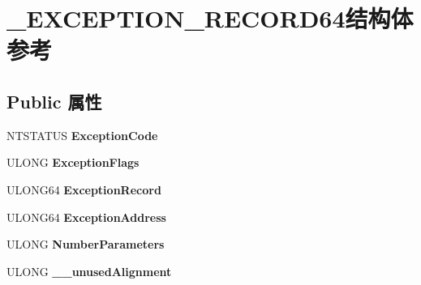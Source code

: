 \hypertarget{struct___e_x_c_e_p_t_i_o_n___r_e_c_o_r_d64}{}\section{\+\_\+\+E\+X\+C\+E\+P\+T\+I\+O\+N\+\_\+\+R\+E\+C\+O\+R\+D64结构体 参考}
\label{struct___e_x_c_e_p_t_i_o_n___r_e_c_o_r_d64}
\subsection*{Public 属性}
\begin{DoxyCompactItemize}
\item 
\mbox{\label{struct___e_x_c_e_p_t_i_o_n___r_e_c_o_r_d64_a2ff9479902da1b59f09d85f098fdedaf}} 
N\+T\+S\+T\+A\+T\+US {\bfseries Exception\+Code}
\item 
\mbox{\label{struct___e_x_c_e_p_t_i_o_n___r_e_c_o_r_d64_a240f00c06caf33235b0e48516a786c49}} 
U\+L\+O\+NG {\bfseries Exception\+Flags}
\item 
\mbox{\label{struct___e_x_c_e_p_t_i_o_n___r_e_c_o_r_d64_aec6ebe4e749c77ec8ce890b4c0e4ae62}} 
U\+L\+O\+N\+G64 {\bfseries Exception\+Record}
\item 
\mbox{\label{struct___e_x_c_e_p_t_i_o_n___r_e_c_o_r_d64_af3ad9ace4f9fd8a05f9067f952296b9f}} 
U\+L\+O\+N\+G64 {\bfseries Exception\+Address}
\item 
\mbox{\label{struct___e_x_c_e_p_t_i_o_n___r_e_c_o_r_d64_a933857db37824ccec22f0f572b9fbbd4}} 
U\+L\+O\+NG {\bfseries Number\+Parameters}
\item 
\mbox{\label{struct___e_x_c_e_p_t_i_o_n___r_e_c_o_r_d64_af98a4858bdd550dceaac222e20145a9c}} 
U\+L\+O\+NG {\bfseries \+\_\+\+\_\+unused\+Alignment}
\item 
\mbox{\label{struct___e_x_c_e_p_t_i_o_n___r_e_c_o_r_d64_a47f0b533f4ad1229e704a7ca41b03ee3}} 

\end{DoxyCompactItemize}
